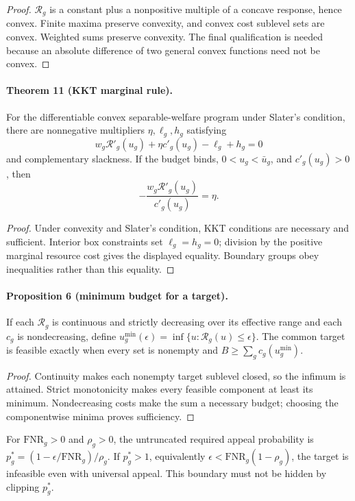 \begin{proof}
$\mathcal{R}_g$ is a constant plus a nonpositive multiple of a concave response, hence
convex.  Finite maxima preserve convexity, and convex cost sublevel sets are
convex.  Weighted sums preserve convexity.  The final qualification is needed
because an absolute difference of two general convex functions need not be
convex.
\end{proof}

\paragraph{Theorem 11 (KKT marginal rule).}
For the differentiable convex separable-welfare program under Slater's
condition, there are nonnegative multipliers $\eta,\ell_g,h_g$ satisfying
\[
w_g\mathcal{R}'_g(u_g)+\eta c'_g(u_g)-\ell_g+h_g=0
\]
and complementary slackness.  If the budget binds,
$0<u_g<\bar u_g$, and $c'_g(u_g)>0$, then
\[
-\frac{w_g\mathcal{R}'_g(u_g)}{c'_g(u_g)}=\eta.
\]

\begin{proof}
Under convexity and Slater's condition, KKT conditions are necessary and
sufficient.  Interior box constraints set $\ell_g=h_g=0$; division by the
positive marginal resource cost gives the displayed equality.  Boundary
groups obey inequalities rather than this equality.
\end{proof}

\paragraph{Proposition 6 (minimum budget for a target).}
If each $\mathcal{R}_g$ is continuous and strictly decreasing over its effective range
and each $c_g$ is nondecreasing, define
$u_g^{\min}(\epsilon)=\inf\{u:\mathcal{R}_g(u)\le\epsilon\}$.  The common target is
feasible exactly when every set is nonempty and
$B\ge\sum_gc_g(u_g^{\min})$.

\begin{proof}
Continuity makes each nonempty target sublevel closed, so the infimum is
attained.  Strict monotonicity makes every feasible component at least its
minimum.  Nondecreasing costs make the sum a necessary budget; choosing the
componentwise minima proves sufficiency.
\end{proof}

For $\mathrm{FNR}_g>0$ and $\rho_g>0$, the untruncated required appeal
probability is
$p_g^*=(1-\epsilon/\mathrm{FNR}_g)/\rho_g$.  If $p_g^*>1$, equivalently
$\epsilon<\mathrm{FNR}_g(1-\rho_g)$, the target is infeasible even with
universal appeal.  This boundary must not be hidden by clipping $p_g^*$.

